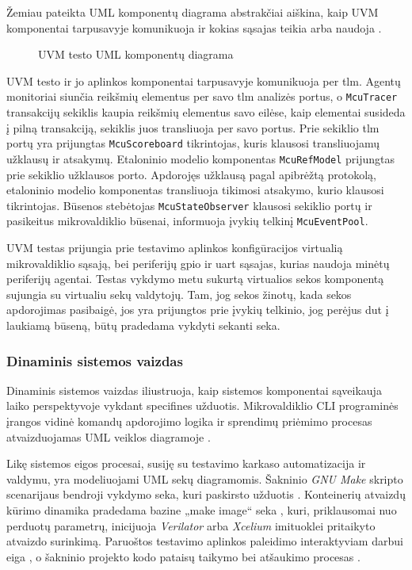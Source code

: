 Žemiau pateikta UML komponentų diagrama abstrakčiai aiškina, kaip UVM komponentai tarpusavyje komunikuoja ir kokias sąsajas teikia arba naudoja \pav{\ref{fig:uml_component_tb}}.

\begin{figure}[H]
	
	\caption{UVM testo UML komponentų diagrama}
	\label{fig:uml_component_tb}
\end{figure}

UVM testo ir jo aplinkos komponentai tarpusavyje komunikuoja per \gls{tlm}. Agentų monitoriai siunčia reikšmių elementus per savo \gls{tlm} analizės portus, o \texttt{McuTracer} transakcijų sekiklis kaupia reikšmių elementus savo eilėse, kaip elementai susideda į pilną transakciją, sekiklis juos transliuoja per savo portus. Prie sekiklio \gls{tlm} portų yra prijungtas \texttt{McuScoreboard} tikrintojas, kuris klausosi transliuojamų užklausų ir atsakymų. Etaloninio modelio komponentas \texttt{McuRefModel} prijungtas prie sekiklio užklausos porto. Apdorojęs užklausą pagal apibrėžtą protokolą, etaloninio modelio komponentas transliuoja tikimosi atsakymo, kurio klausosi tikrintojas. Būsenos stebėtojas \texttt{McuStateObserver} klausosi sekiklio portų ir pasikeitus mikrovaldiklio būsenai, informuoja įvykių telkinį \texttt{McuEventPool}.

UVM testas prijungia prie testavimo aplinkos konfigūracijos virtualią mikrovaldiklio sąsają, bei periferijų \gls{gpio} ir \gls{uart} sąsajas, kurias naudoja minėtų periferijų agentai. Testas vykdymo metu sukurtą virtualios sekos komponentą sujungia su virtualiu sekų valdytojų. Tam, jog sekos žinotų, kada sekos apdorojimas pasibaigė, jos yra prijungtos prie įvykių telkinio, jog perėjus \gls{dut} į laukiamą būseną, būtų pradedama vykdyti sekanti seka.


\subsubsection{Dinaminis sistemos vaizdas}

Dinaminis sistemos vaizdas iliustruoja, kaip sistemos komponentai sąveikauja laiko perspektyvoje vykdant specifines užduotis. Mikrovaldiklio CLI programinės įrangos vidinė komandų apdorojimo logika ir sprendimų priėmimo procesas atvaizduojamas UML veiklos diagramoje \pav{\ref{fig:uml_activity_cli}}.

Likę sistemos eigos procesai, susiję su testavimo karkaso automatizacija ir valdymu, yra modeliuojami UML sekų diagramomis. Šakninio \textit{GNU Make} skripto scenarijaus bendroji vykdymo seka, kuri paskirsto užduotis \pav{\ref{fig:uml_seq_root_make}}. Konteinerių atvaizdų kūrimo dinamika pradedama bazine „make image“ seka \pav{\ref{fig:uml_seq_make_image}}, kuri, priklausomai nuo perduotų parametrų, inicijuoja \textit{Verilator} \pav{\ref{fig:uml_seq_make_image_verilator}} arba \textit{Xcelium} \pav{\ref{fig:uml_seq_make_image_xcelium}} imituoklei pritaikyto atvaizdo surinkimą. Paruoštos testavimo aplinkos paleidimo interaktyviam darbui eiga \pav{\ref{fig:uml_seq_make_run}}, o šakninio projekto kodo pataisų taikymo bei atšaukimo procesas \pav{\ref{fig:uml_seq_make_patch}}.

